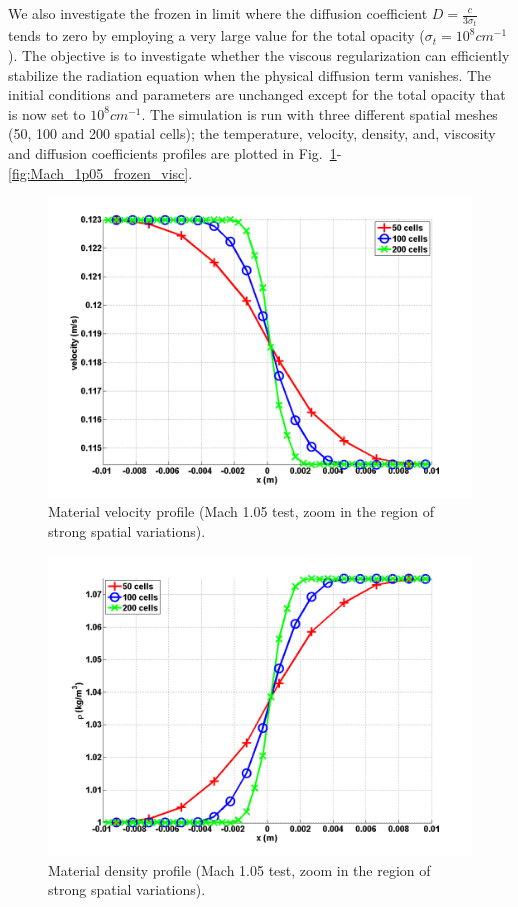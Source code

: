 \documentclass[review]{elsarticle}
\newcommand{\fig}[1]{Fig.~\ref{#1}}                      %
\begin{document}
We also investigate the frozen in limit where the diffusion coefficient $D = \frac{c}{3\sigma_t}$ tends to zero by employing a very large value for the total opacity ($\sigma_t = 10^8 cm^{-1}$). The objective is to investigate whether the viscous regularization can efficiently stabilize the radiation equation when the physical diffusion term vanishes. The initial conditions and parameters are unchanged except for the total opacity that is now set to $10^8 cm^{-1}$. The simulation is run with three different spatial meshes (50, 100 and 200 spatial cells); the temperature, velocity, density, and, viscosity and diffusion coefficients profiles are plotted in \fig{fig:Mach_1p05_frozen_density}-\ref{fig:Mach_1p05_frozen_visc}.
%
\begin{figure}[H]
        \centering
        \includegraphics[width=\textwidth]{figs/Mach_1p05_zoom_in_velocity.png}
        \caption{Material velocity profile (Mach 1.05 test, zoom in the region of strong spatial variations).}
        \label{fig:Mach_1p05_frozen_density}
\end{figure}%
\begin{figure}[H]
            \centering
            \includegraphics[width=\textwidth]{figs/Mach_1p05_zoom_in_density.png}
            \caption{Material density profile (Mach 1.05 test, zoom in the region of strong spatial variations).}
            \label{fig:Mach_1p05_frozen_velocity}
\end{figure}
\end{document}
